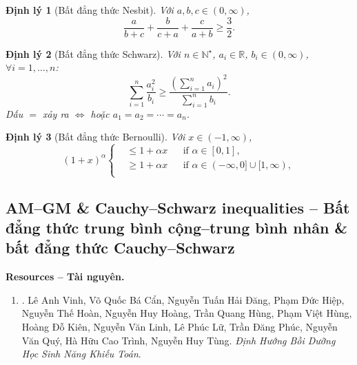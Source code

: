 \documentclass{article}
\newtheorem{dinhly}{Định lý}
\begin{document}
\begin{dinhly}[Bất đẳng thức Nesbit]
	Với $a,b,c\in(0,\infty)$,
	\begin{equation}
		\label{Nesbit inequality}
		\tag{N}
		\frac{a}{b + c} + \frac{b}{c + a} + \frac{c}{a + b}\ge\frac{3}{2}.
	\end{equation}
\end{dinhly}

\begin{dinhly}[Bất đẳng thức Schwarz]
	Với $n\in\mathbb{N}^\star$, $a_i\in\mathbb{R}$, $b_i\in(0,\infty)$, $\forall i = 1,\ldots,n$:
	\begin{equation}
		\label{Schwarz inequality}
		\tag{Sch}
		\sum_{i=1}^n \frac{a_i^2}{b_i}\ge\frac{\left(\sum_{i=1}^n a_i\right)^2}{\sum_{i=1}^n b_i}.
	\end{equation}
	Dấu $=$ xảy ra $\Leftrightarrow$ hoặc $a_1 = a_2 = \cdots = a_n$.
\end{dinhly}

\begin{dinhly}[Bất đẳng thức Bernoulli]
	Với $x\in(-1,\infty)$,
	\begin{equation}
		\label{Bernoulli inequality}
		\tag{B}
		(1 + x)^\alpha\left\{\begin{split}
			&\le1 + \alpha x&&\mbox{if }\alpha\in[0,1],\\
			&\ge1 + \alpha x&&\mbox{if }\alpha\in(-\infty,0]\cup[1,\infty),\\
		\end{split}\right.
	\end{equation}
\end{dinhly}

\subsection{AM--GM \& Cauchy--Schwarz inequalities -- Bất đẳng thức trung bình cộng--trung bình nhân \& bất đẳng thức Cauchy--Schwarz}
\textbf{\textsf{Resources -- Tài nguyên.}}
\begin{enumerate}
	\item \cite[Chap. 3: AM--GM \& Cauchy--Schwarz, pp. 55--80]{Vinh_dinh_huong_Olympic_Toan}. {\sc Lê Anh Vinh, Võ Quốc Bá Cẩn, Nguyễn Tuấn Hải Đăng, Phạm Đức Hiệp, Nguyễn Thế Hoàn, Nguyễn Huy Hoàng, Trần Quang Hùng, Phạm Việt Hùng, Hoàng Đỗ Kiên, Nguyễn Văn Linh, Lê Phúc Lữ, Trần Đăng Phúc, Nguyễn Văn Quý, Hà Hữu Cao Trình, Nguyễn Huy Tùng}. {\it Định Hướng Bồi Dưỡng Học Sinh Năng Khiếu Toán}.
\end{enumerate}
\end{document}

